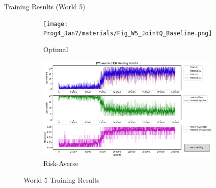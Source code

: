 \documentclass[aspectratio=1610, xcolor=dvipsnames]{packages/beamer}
\begin{document}
\begin{frame}{Training Results (World 5)}
     \begin{figure}
     \centering
          \begin{subfigure}[b]{\Wfig\textwidth}  \centering
              \texttt{[image: Prog4\_Jan7/materials/Fig\_W5\_JointQ\_Baseline.png]}
              \caption{Optimal} \label{fig:W5baseline}
          \end{subfigure}
          \hfill
         \begin{subfigure}[b]{\Wfig\textwidth} \centering
             \includegraphics[width=\textwidth]{../results/IDQN_W5/Fig_W5_JointQ_Averse}
             \caption{Risk-Averse} \label{fig:W5averse}
         \end{subfigure}
    \caption{World 5 Training Results}
    \label{fig:W5}
    \end{figure}
\end{frame}
\end{document}
